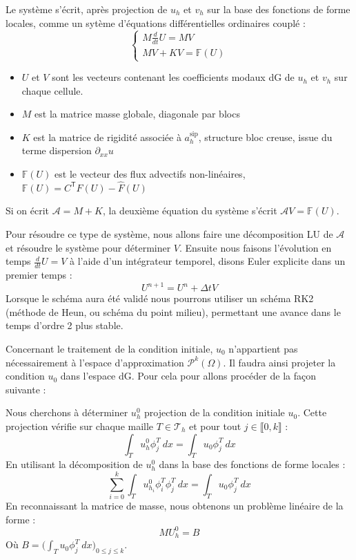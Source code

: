 Le système s'écrit, après projection de $u_h$ et $v_h$ sur la base des fonctions de forme locales, comme un sytème d'équations différentielles ordinaires couplé :
$$\begin{cases}
    M \frac{d}{dt} U = M V \\
    MV + KV = \mathbb{F}(U)
\end{cases}$$


\begin{itemize}
    \item $U$ et $V$ sont les vecteurs contenant les coefficients modaux dG de $u_h$ et $v_h$ sur chaque cellule.
    \item $M$ est la matrice masse globale, diagonale par blocs
    \item $K$ est la matrice de rigidité associée à $a_h^{\text{sip}}$, structure bloc creuse, issue du terme dispersion $\partial_{xx}u$
    \item $\mathbb{F}(U)$ est le vecteur des flux advectifs non-linéaires, $\mathbb{F}(U) = C^{\mathsf{T}}F(U) - \widehat{F}(U)$
\end{itemize}
Si on écrit $\mathcal{A} = M + K$, la deuxième équation du système s'écrit $\mathcal{A}V = \mathbb{F}(U)$.
\vspace{1em}

Pour résoudre ce type de système, nous allons faire une décomposition LU de $\mathcal{A}$ et résoudre le système pour déterminer $V$. 
Ensuite nous faisons l'évolution en temps $\frac{d}{dt}U = V$ à l'aide d'un intégrateur temporel, disons Euler explicite dans un premier temps :
$$U^{n+1} = U^n + \Delta t V$$
Lorsque le schéma aura été validé nous pourrons utiliser un schéma RK2 (méthode de Heun, ou schéma du point milieu), permettant une avance dans le temps d'ordre 2 plus stable.

\vspace{1em}

Concernant le traitement de la condition initiale, $u_0$ n'appartient pas nécessairement à l'espace d'approximation $\mathcal{P}^k(\Omega)$. 
Il faudra ainsi projeter la condition $u_0$ dans l'espace dG. Pour cela pour allons procéder de la façon suivante :

Nous cherchons à déterminer $u_h^0$ projection de la condition initiale $u_0$.
Cette projection vérifie sur chaque maille $T \in \mathcal{T}_h$ et pour tout $j\in \llbracket 0,k \rrbracket$ :
$$\int_{T} u_h^0 \phi_j^T \ dx = \int_{T} u_0 \phi_j^T \ dx$$
En utilisant la décomposition de $u_h^0$ dans la base des fonctions de forme locales :
$$\sum_{i=0}^{k} \int_{T} u_{h_i}^0 \phi_i^T \phi_j^T \ dx = \int_{T} u_0 \phi_j^T \ dx $$
En reconnaissant la matrice de masse, nous obtenons un problème linéaire de la forme :
$$M U_h^0 = B $$
Où $B = \big(\int_{T} u_0 \phi_j ^T \ dx\big)_{0 \leq j\leq k} $.

